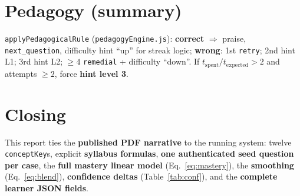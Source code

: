 \documentclass[12pt,a4paper]{article}
\begin{document}
\section{Pedagogy (summary)}

\texttt{applyPedagogicalRule} (\texttt{pedagogyEngine.js}):
\textbf{correct} $\Rightarrow$ praise, \texttt{next\_question}, difficulty hint ``up'' for streak logic;
\textbf{wrong}: 1st \texttt{retry}; 2nd hint L1; 3rd hint L2; $\ge 4$ \texttt{remedial} + difficulty ``down''.
If $t_{\mathrm{spent}}/t_{\mathrm{expected}}>2$ and attempts $\ge 2$, force \textbf{hint level 3}.

\section{Closing}

This report ties the \textbf{published PDF narrative} to the running system: twelve
\texttt{conceptKey}s, explicit \textbf{syllabus formulas}, \textbf{one authenticated seed question per case},
the \textbf{full mastery linear model} (Eq.~\ref{eq:mastery}), the \textbf{smoothing} (Eq.~\ref{eq:blend}),
\textbf{confidence deltas} (Table~\ref{tab:conf}), and the \textbf{complete learner JSON fields}.
\end{document}

